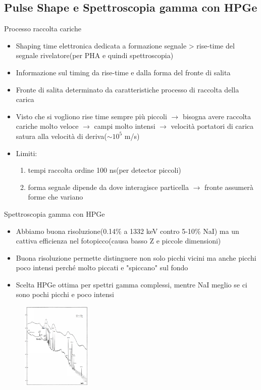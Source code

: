\documentclass{beamer}
\begin{document}
\subsection{Pulse Shape e Spettroscopia gamma con HPGe}
\begin{frame}{Processo raccolta cariche}
\begin{itemize}
    \item Shaping time elettronica dedicata a formazione segnale > rise-time del segnale rivelatore(per PHA e quindi spettroscopia)
    \item Informazione sul timing da rise-time e dalla forma del fronte di salita
    \item Fronte di salita determinato da caratteristiche processo di raccolta della carica
    \item Visto che si vogliono rise time sempre più piccoli $\to$ bisogna avere raccolta cariche molto veloce $\to$ campi molto intensi $\to$ velocità portatori di carica satura alla velocità di deriva($\sim 10^5$ m/s)
    \item Limiti: \begin{enumerate}
        \item tempi raccolta ordine 100 ns(per detector piccoli)
        \item forma segnale dipende da dove interagisce particella $\to$ fronte assumerà forme che variano
    \end{enumerate} 
\end{itemize}
    
\end{frame}

\begin{frame}{Spettroscopia gamma con HPGe}
    \begin{itemize}
        \item Abbiamo buona risoluzione(0.14\% a 1332 keV contro 5-10\% NaI) ma un cattiva efficienza nel fotopicco(causa basso Z e piccole dimensioni)
        \item Buona risoluzione permette distinguere non solo picchi vicini ma anche picchi poco intensi perché molto piccati e "spiccano" sul fondo
        \item Scelta HPGe ottima per spettri gamma complessi, mentre NaI meglio se ci sono pochi picchi e poco intensi
    \end{itemize}
    \begin{figure}
        \centering
        \includegraphics[width=0.3\textwidth]{images/confronto_spettro_hpge_nai.png}
    \end{figure}
\end{frame}
\end{document}
